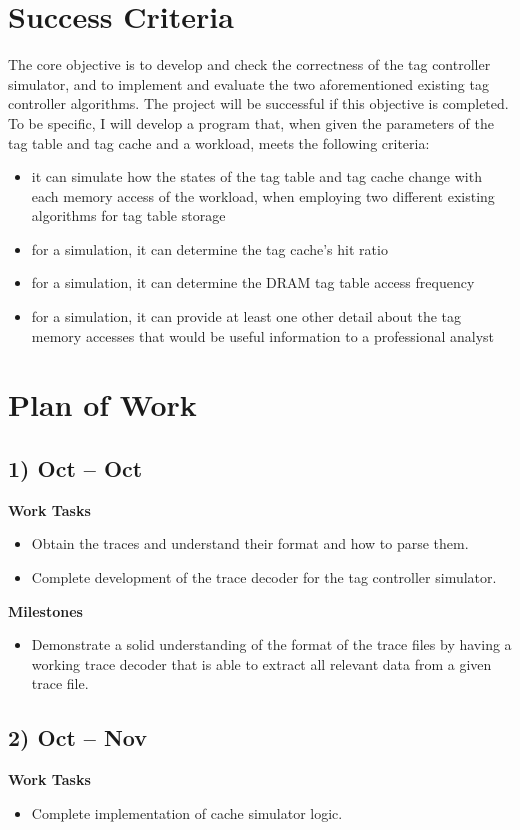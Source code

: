 \documentclass[10pt,a4paper]{article}
\begin{document}
\section*{Success Criteria}
The core objective is to develop and check the correctness of the tag controller simulator, and to implement and evaluate the two aforementioned existing tag controller algorithms. The project will be successful if this objective is completed. To be specific, I will develop a program that, when given the parameters of the tag table and tag cache and a workload, meets the following criteria:
\begin{itemize}
	\item it can simulate how the states of the tag table and tag cache change with each memory access of the workload, when employing two different existing algorithms for tag table storage
	\item for a simulation, it can determine the tag cache's hit ratio
	\item for a simulation, it can determine the DRAM tag table access frequency
	\item for a simulation, it can provide at least one other detail about the tag memory accesses that would be useful information to a professional analyst
\end{itemize}

\section*{Plan of Work}
\subsection*{1)  Oct --  Oct}
\textbf{Work Tasks}
\begin{itemize}
	\item Obtain the traces and understand their format and how to parse them.
	\item Complete development of the trace decoder for the tag controller simulator.
\end{itemize}

\textbf{Milestones}
\begin{itemize}
	\item Demonstrate a solid understanding of the format of the trace files by having a working trace decoder that is able to extract all relevant data from a given trace file.
\end{itemize}

\subsection*{2)  Oct --  Nov}
\textbf{Work Tasks}
\begin{itemize}
	\item Complete implementation of cache simulator logic.
\end{itemize}
\end{document}
